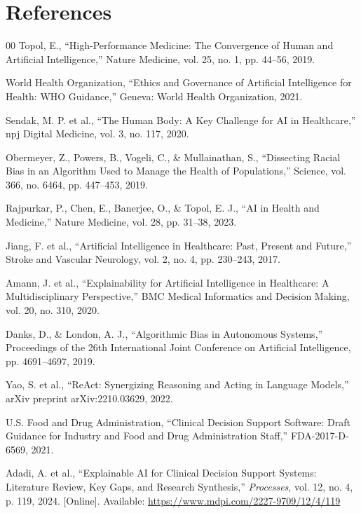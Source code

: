\documentclass[journal]{IEEEtran}
\begin{document}
\section*{References}
\begin{thebibliography}{00}
 Topol, E., ``High-Performance Medicine: The Convergence of Human and Artificial Intelligence,'' Nature Medicine, vol. 25, no. 1, pp. 44--56, 2019.

 World Health Organization, ``Ethics and Governance of Artificial Intelligence for Health: WHO Guidance,'' Geneva: World Health Organization, 2021.

 Sendak, M. P. et al., ``The Human Body: A Key Challenge for AI in Healthcare,'' npj Digital Medicine, vol. 3, no. 117, 2020.

 Obermeyer, Z., Powers, B., Vogeli, C., \& Mullainathan, S., ``Dissecting Racial Bias in an Algorithm Used to Manage the Health of Populations,'' Science, vol. 366, no. 6464, pp. 447--453, 2019.

 Rajpurkar, P., Chen, E., Banerjee, O., \& Topol, E. J., ``AI in Health and Medicine,'' Nature Medicine, vol. 28, pp. 31--38, 2023.

 Jiang, F. et al., ``Artificial Intelligence in Healthcare: Past, Present and Future,'' Stroke and Vascular Neurology, vol. 2, no. 4, pp. 230--243, 2017.

 Amann, J. et al., ``Explainability for Artificial Intelligence in Healthcare: A Multidisciplinary Perspective,'' BMC Medical Informatics and Decision Making, vol. 20, no. 310, 2020.

 Danks, D., \& London, A. J., ``Algorithmic Bias in Autonomous Systems,'' Proceedings of the 26th International Joint Conference on Artificial Intelligence, pp. 4691--4697, 2019.

 Yao, S. et al., ``ReAct: Synergizing Reasoning and Acting in Language Models,'' arXiv preprint arXiv:2210.03629, 2022.

 U.S. Food and Drug Administration, ``Clinical Decision Support Software: Draft Guidance for Industry and Food and Drug Administration Staff,'' FDA-2017-D-6569, 2021.

 Adadi, A. et al., ``Explainable AI for Clinical Decision Support Systems: Literature Review, Key Gaps, and Research Synthesis,'' \textit{Processes}, vol. 12, no. 4, p. 119, 2024. [Online]. Available: \url{https://www.mdpi.com/2227-9709/12/4/119}


\end{thebibliography}
\end{document}

